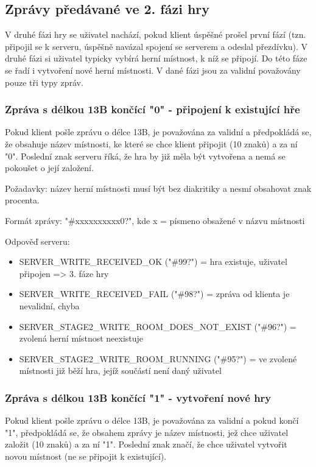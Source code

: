 \documentclass[12pt, a4paper, pdftex, czech, titlepage]{report}
\begin{document}
\subsection{Zprávy předávané ve 2. fázi hry}
V druhé fázi hry se uživatel nachází, pokud klient úspěšné prošel
první fází (tzn. připojil se k serveru, úspěšně
 navázal spojení se serverem a odeslal přezdívku). V druhé fázi
si uživatel typicky vybírá herní místnost, k níž se připojí.
Do této fáze se řadí i vytvoření nové herní místnosti.
V dané fázi jsou za validní považovány pouze tři typy zpráv.

\subsubsection{Zpráva s délkou 13B končící "0" - připojení k existující hře}
Pokud klient pošle zprávu o délce 13B, je považována
za validní a předpokládá se, že obsahuje název místnosti, ke které
se chce klient připojit (10 znaků) a za ní "0". Poslední
znak serveru říká, že hra by již měla být vytvořena a nemá se pokoušet
o její založení.

Požadavky: název herní místnosti musí být bez diakritiky a nesmí obsahovat
znak procenta.

Formát zprávy: "\#xxxxxxxxxx0?", kde x = písmeno obsažené v názvu místnosti

Odpověď serveru:
\begin{itemize}
\item SERVER\_WRITE\_RECEIVED\_OK ("\#99?") = hra existuje, uživatel připojen => 3. fáze hry
\item SERVER\_WRITE\_RECEIVED\_FAIL ("\#98?") = zpráva od klienta je nevalidní, chyba
\item SERVER\_STAGE2\_WRITE\_ROOM\_DOES\_NOT\_EXIST ("\#96?") = zvolená herní místnost neexistuje
\item SERVER\_STAGE2\_WRITE\_ROOM\_RUNNING ("\#95?") = ve zvolené místnosti již běží hra, jejíž součástí není daný uživatel
\end{itemize}

\subsubsection{Zpráva s délkou 13B končící "1" - vytvoření nové hry}
Pokud klient pošle zprávu o délce 13B, je považována
za validní a pokud končí "1", předpokládá se, že obsahem zprávy je název
místnosti, jež chce uživatel založit (10 znaků) a za ní "1". Poslední
znak značí, že chce uživatel vytvořit novou místnost (ne se připojit k existující).
\end{document}
